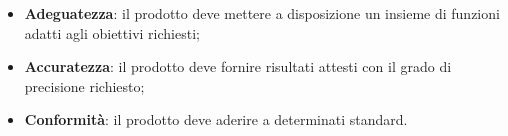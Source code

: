 \begin{itemize}
    \item \textbf{Adeguatezza}: il prodotto deve mettere a disposizione un insieme di funzioni adatti agli obiettivi richiesti;
    \item \textbf{Accuratezza}: il prodotto deve fornire risultati attesti con il grado di precisione richiesto;
    \item \textbf{Conformità}: il prodotto deve aderire a determinati standard.
\end{itemize}